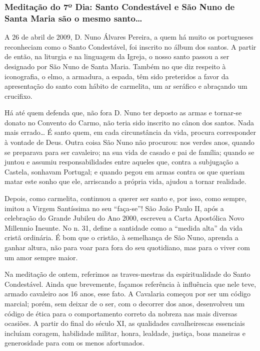 \documentclass[a4paper,14pt]{extarticle} \usepackage[utf8]{inputenc}
\begin{document}
\subsubsection{Meditação do 7º Dia: Santo Condestável e São Nuno de Santa Maria são o mesmo santo…}

A 26 de abril de 2009, D. Nuno Álvares Pereira, a quem há muito os portugueses reconheciam como o Santo Condestável, foi inscrito no álbum dos santos. A partir de então, na liturgia e na linguagem da Igreja, o nosso santo passou a ser designado por São Nuno de Santa Maria. Também no que diz respeito à iconografia, o elmo, a armadura, a espada, têm sido preteridos a favor da apresentação do santo com hábito de carmelita, um ar seráfico e abraçando um crucifixo.

Há até quem defenda que, não fora D. Nuno ter deposto as armas e tornar-se donato no Convento do Carmo, não teria sido inscrito no cânon dos santos. Nada mais errado… É santo quem, em cada circunstância da vida, procura corresponder à vontade de Deus. Outra coisa São Nuno não procurou: nos verdes anos, quando se preparava para ser cavaleiro; na sua vida de casado e pai de família; quando se juntou e assumiu responsabilidades entre aqueles que, contra a subjugação a Castela, sonhavam Portugal; e quando pegou em armas contra os que queriam matar este sonho que ele, arriscando a própria vida, ajudou a tornar realidade.

Depois, como carmelita, continuou a querer ser santo e, por isso, como sempre, imitou a Virgem Santíssima no seu “faça-se”! São João Paulo II, após a celebração do Grande Jubileu do Ano 2000, escreveu a Carta Apostólica Novo Millennio Ineunte. No n. 31, define a santidade como a “medida alta” da vida cristã ordinária. É bom que o cristão, à semelhança de São Nuno, aprenda a ganhar altura, não para voar para fora do seu quotidiano, mas para o viver com um amor sempre maior.

Na meditação de ontem, referimos as traves-mestras da espiritualidade do Santo Condestável. Ainda que brevemente, façamos referência à influência que nele teve, armado cavaleiro aos 16 anos, esse fato. A Cavalaria começou por ser um código marcial; porém, sem deixar de o ser, com o decorrer dos anos, desenvolveu um código de ética para o comportamento correto da nobreza nas mais diversas ocasiões. A partir do final do século XI, as qualidades cavalheirescas essenciais incluíam coragem, habilidade militar, honra, lealdade, justiça, boas maneiras e generosidade para com os menos afortunados.
\end{document}
